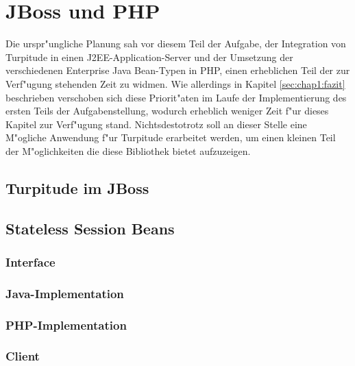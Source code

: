 \chapter{JBoss und PHP}
\label{sec:chap2}

Die urspr"ungliche Planung sah vor diesem Teil der Aufgabe, der Integration von Turpitude in einen
J2EE-Application-Server und der Umsetzung der verschiedenen Enterprise Java Bean-Typen in PHP, einen
erheblichen Teil der zur Verf"ugung stehenden Zeit zu widmen. Wie allerdings in Kapitel \ref{sec:chap1:fazit}
beschrieben verschoben sich diese Priorit"aten im Laufe der Implementierung des ersten Teils der Aufgabenstellung,
wodurch erheblich weniger Zeit f"ur dieses Kapitel zur Verf"ugung stand. Nichtsdestotrotz soll an dieser Stelle
eine M"ogliche Anwendung f"ur Turpitude erarbeitet werden, um einen kleinen Teil der M"oglichkeiten die diese 
Bibliothek bietet aufzuzeigen.





\section{Turpitude im JBoss}
\label{sec:chap2:turp}

\section{Stateless Session Beans}
\label{sec:chap2:slsb}

\subsection{Interface}
\label{sec:chap2:slsb:if}

\subsection{Java-Implementation}
\label{sec:chap2:slsb:java}

\subsection{PHP-Implementation}
\label{sec:chap2:slsb:java}

\subsection{Client}
\label{sec:chap2:slsb:Client}



